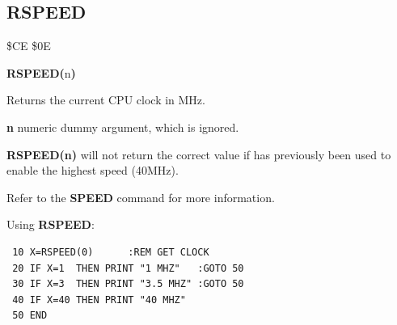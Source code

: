 \subsection{RSPEED}
\begin{description}[leftmargin=2cm,style=nextline]
\item [Token:] \$CE \$0E
\item [Format:] {\bf RSPEED(}n{\bf)}
\item [Usage:]  Returns the current CPU clock in MHz.

                {\bf n} numeric dummy argument, which is ignored.

\item [Remarks:] {\bf RSPEED(n)} will not return the correct value if 
                 has previously been used to enable the highest speed (40MHz).

                 Refer to the {\bf SPEED} command for more information.

\item [Example:] Using {\bf RSPEED}:
\begin{tcolorbox}[colback=black,coltext=white]
\verbatimfont{\codefont}
\begin{verbatim}
 10 X=RSPEED(0)      :REM GET CLOCK
 20 IF X=1  THEN PRINT "1 MHZ"   :GOTO 50
 30 IF X=3  THEN PRINT "3.5 MHZ" :GOTO 50
 40 IF X=40 THEN PRINT "40 MHZ"
 50 END
\end{verbatim}
\end{tcolorbox}
\end{description}


\newpage

